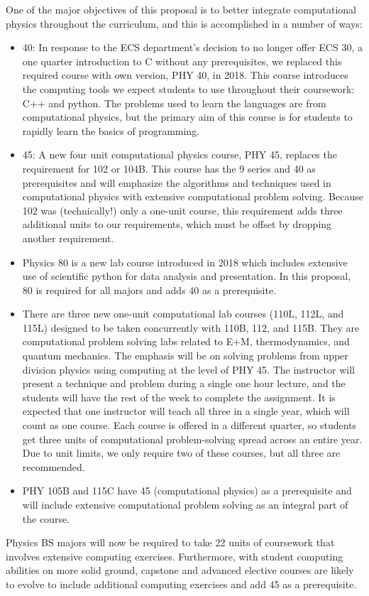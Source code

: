 \documentclass[12pt]{article}
\begin{document}
One of the major objectives of this proposal is to better integrate computational physics throughout the curriculum, and this is accomplished in a number of ways:
\begin{itemize}

\item 40:  In response to the ECS department's decision to no longer offer ECS 30, a one quarter introduction to C without any prerequisites, we replaced this required course with own version, PHY 40, in 2018.  This course introduces the computing tools we expect students to use throughout their coursework:  C++ and python.  The problems used to learn the languages are from computational physics, but the primary aim of this course is for students to rapidly learn the basics of programming.

\item 45:  A new four unit computational physics course, PHY 45, replaces the requirement for 102 or 104B.  This course has the 9 series and 40 as prerequisites and will emphasize the algorithms and techniques used in computational physics with extensive computational problem solving.  Because 102 was (technically!) only a one-unit course, this requirement adds three additional units to our requirements, which must be offset by dropping another requirement.

\item Physics 80 is a new lab course introduced in 2018 which includes extensive use of scientific python for data analysis and presentation.  In this proposal, 80 is required for all majors and adds 40 as a prerequisite.

\item There are three new one-unit computational lab courses (110L, 112L, and 115L) designed to be taken concurrently with 110B, 112, and 115B. They are computational problem solving labs related to E+M, thermodynamics, and quantum mechanics.  The emphasis will be on solving problems from upper division physics using computing at the level of PHY 45.
The instructor will present a technique and problem during a single one hour lecture, and the students will have the rest of the week to complete the assignment. 
It is expected that one instructor will teach all three in a single year, which will count as one course.  Each course is offered in a different quarter, so students get three units of computational problem-solving spread across an entire year.  Due to unit limits, we only require two of these courses, but all three are recommended.

\item PHY 105B and 115C have 45 (computational physics) as a prerequisite and
will include extensive computational problem solving as an integral part of the course.
\end{itemize}
Physics BS majors will now be required to take 22 units of coursework that involves extensive computing exercises.  Furthermore, with student computing abilities on more solid ground, capstone and advanced elective courses are likely to evolve to include additional computing exercises and add 45 as a prerequisite.
\end{document}
